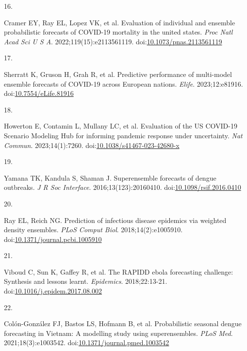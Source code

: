 \documentclass[
]{article}
\newlength{\cslhangindent}
\newlength{\csllabelwidth}
\newenvironment{CSLReferences}[2] %
 {\begin{list}{}{%
  \setlength{\itemindent}{0pt}
  \setlength{\leftmargin}{0pt}
  \setlength{\parsep}{0pt}
  \ifodd #1
   \setlength{\leftmargin}{\cslhangindent}
   \setlength{\itemindent}{-1\cslhangindent}
  \fi
  \setlength{\itemsep}{#2\baselineskip}}}
 {\end{list}}
\newcommand{\CSLLeftMargin}[1]{\parbox[t]{\csllabelwidth}{\strut#1\strut}}
\newcommand{\CSLRightInline}[1]{\parbox[t]{\linewidth - \csllabelwidth}{\strut#1\strut}}
\begin{document}
\begin{CSLReferences}{0}{1}
\CSLLeftMargin{16. }%
\CSLRightInline{Cramer EY, Ray EL, Lopez VK, et al. Evaluation of
individual and ensemble probabilistic forecasts of COVID-19 mortality in
the united states. \emph{Proc Natl Acad Sci U S A}.
2022;119(15):e2113561119.
doi:\href{https://doi.org/10.1073/pnas.2113561119}{10.1073/pnas.2113561119}}

\CSLLeftMargin{17. }%
\CSLRightInline{Sherratt K, Gruson H, Grah R, et al. Predictive
performance of multi-model ensemble forecasts of {COVID}-19 across
{European} nations. \emph{Elife}. 2023;12:e81916.
doi:\href{https://doi.org/10.7554/eLife.81916}{10.7554/eLife.81916}}

\CSLLeftMargin{18. }%
\CSLRightInline{Howerton E, Contamin L, Mullany LC, et al. Evaluation of
the {US} {COVID}-19 {Scenario} {Modeling} {Hub} for informing pandemic
response under uncertainty. \emph{Nat Commun}. 2023;14(1):7260.
doi:\href{https://doi.org/10.1038/s41467-023-42680-x}{10.1038/s41467-023-42680-x}}

\CSLLeftMargin{19. }%
\CSLRightInline{Yamana TK, Kandula S, Shaman J. Superensemble forecasts
of dengue outbreaks. \emph{J R Soc Interface}. 2016;13(123):20160410.
doi:\href{https://doi.org/10.1098/rsif.2016.0410}{10.1098/rsif.2016.0410}}

\CSLLeftMargin{20. }%
\CSLRightInline{Ray EL, Reich NG. Prediction of infectious disease
epidemics via weighted density ensembles. \emph{PLoS Comput Biol}.
2018;14(2):e1005910.
doi:\href{https://doi.org/10.1371/journal.pcbi.1005910}{10.1371/journal.pcbi.1005910}}

\CSLLeftMargin{21. }%
\CSLRightInline{Viboud C, Sun K, Gaffey R, et al. The RAPIDD ebola
forecasting challenge: Synthesis and lessons learnt. \emph{Epidemics}.
2018;22:13-21.
doi:\href{https://doi.org/10.1016/j.epidem.2017.08.002}{10.1016/j.epidem.2017.08.002}}

\CSLLeftMargin{22. }%
\CSLRightInline{Colón-González FJ, Bastos LS, Hofmann B, et al.
Probabilistic seasonal dengue forecasting in {Vietnam}: {A} modelling
study using superensembles. \emph{PLoS Med}. 2021;18(3):e1003542.
doi:\href{https://doi.org/10.1371/journal.pmed.1003542}{10.1371/journal.pmed.1003542}}


\end{CSLReferences}
\end{document}
